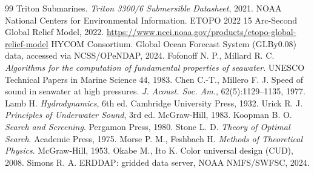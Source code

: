\documentclass[UTF8,11pt,a4paper]{ctexart}
\begin{document}
\newpage
\begin{thebibliography}{99}\small
\setlength{\itemsep}{0pt}
 Triton Submarines. \emph{Triton 3300/6 Submersible Datasheet}, 2021.
 NOAA National Centers for Environmental Information. ETOPO 2022
  15 Arc-Second Global Relief Model, 2022. \url{https://www.ncei.noaa.gov/products/etopo-global-relief-model}
 HYCOM Consortium. Global Ocean Forecast System (GLBy0.08) data,
  accessed via NCSS/OPeNDAP, 2024.
 Fofonoff N. P., Millard R. C. \emph{Algorithms for the computation of
  fundamental properties of seawater}. UNESCO Technical Papers in Marine Science 44, 1983.
 Chen C.-T., Millero F. J. Speed of sound in seawater at high pressures.
  \emph{J. Acoust. Soc. Am.}, 62(5):1129--1135, 1977.
 Lamb H. \emph{Hydrodynamics}, 6th ed. Cambridge University Press, 1932.
 Urick R. J. \emph{Principles of Underwater Sound}, 3rd ed. McGraw-Hill, 1983.
 Koopman B. O. \emph{Search and Screening}. Pergamon Press, 1980.
 Stone L. D. \emph{Theory of Optimal Search}. Academic Press, 1975.
 Morse P. M., Feshbach H. \emph{Methods of Theoretical Physics}. McGraw-Hill, 1953.
 Okabe M., Ito K. Color universal design (CUD), 2008.
 Simons R. A. ERDDAP: gridded data server, NOAA NMFS/SWFSC, 2024.
\end{thebibliography}

\newpage
\appendix

\end{document}

